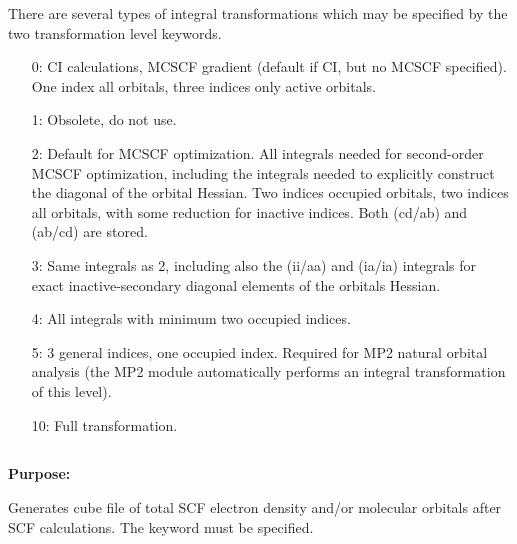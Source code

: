 
There are several types of integral transformations which may be
specified by the two transformation level keywords.
\begin{itemize}
   \item[0:] CI calculations, MCSCF gradient (default if CI, but
             no MCSCF specified).
             One index all orbitals, three indices only active
             orbitals.

   \item[1:] Obsolete, do not use.

   \item[2:] Default for MCSCF optimization. All integrals needed for {\sir}
             second-order MCSCF optimization, including the integrals
             needed to explicitly construct the diagonal of the orbital
             Hessian. Two indices occupied orbitals, two indices all
             orbitals, with some reduction for inactive indices.
             Both (cd/ab) and (ab/cd) are stored.

   \item[3:] Same integrals as 2, including also the (ii/aa) and
             (ia/ia) integrals for exact inactive-secondary diagonal elements
             of the orbitals Hessian.

   \item[4:] All integrals with minimum two occupied indices.

   \item[5:] 3 general indices, one occupied index.  Required for MP2
             natural orbital analysis (the MP2 module automatically
             performs an integral transformation of this level).

  \item[10:] Full transformation.
\end{itemize}


\pagebreak[3]
\subsection{\label{ref-cube}}

{\bf Purpose:}

Generates cube file of total SCF electron density and/or
molecular orbitals after SCF calculations. The keyword 
must be specified.

